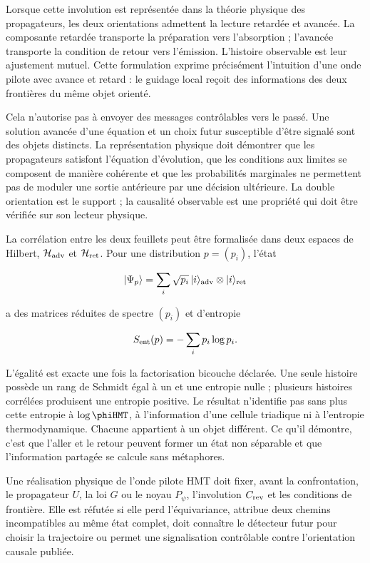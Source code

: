 Lorsque cette involution est représentée dans la théorie physique des propagateurs, les deux
orientations admettent la lecture retardée et avancée. La composante retardée
transporte la préparation vers l'absorption ; l'avancée transporte la condition
de retour vers l'émission. L'histoire observable est leur ajustement mutuel. Cette
formulation exprime précisément l'intuition d'une onde pilote avec avance
et retard : le guidage local reçoit des informations des deux frontières du même objet
orienté.

Cela n'autorise pas à envoyer des messages contrôlables vers le passé.
Une solution avancée d'une équation et un choix futur susceptible d'être signalé sont des objets
distincts. La représentation physique doit démontrer que les propagateurs satisfont
l'équation d'évolution, que les conditions aux limites se composent
de manière cohérente et que les probabilités marginales ne permettent pas de moduler une
sortie antérieure par une décision ultérieure. La double orientation est le
support ; la causalité observable est une propriété qui doit être vérifiée sur son
lecteur physique.

La corrélation entre les deux feuillets peut être formalisée dans deux espaces de Hilbert,
\(\mathcal H_{\rm adv}\) et \(\mathcal H_{\rm ret}\). Pour une distribution
\(p=(p_i)\), l'état

\[
  |\Psi_p\rangle
  =
  \sum_i\sqrt{p_i}\,
  |i\rangle_{\rm adv}\otimes|i\rangle_{\rm ret}
\]

a des matrices réduites de spectre \((p_i)\) et d'entropie

\[
  S_{\rm ent}(p)=-\sum_i p_i\log p_i.
\]

L'égalité est exacte une fois la factorisation bicouche déclarée. Une seule histoire
possède un rang de Schmidt égal à un et une entropie nulle ; plusieurs histoires corrélées
produisent une entropie positive. Le résultat n'identifie pas sans plus cette entropie à
\(\log\phiHMT\), à l'information d'une cellule triadique ni à l'entropie
thermodynamique. Chacune appartient à un objet différent. Ce qu'il démontre, c'est que
l'aller et le retour peuvent former un état non séparable et que l'information partagée
se calcule sans métaphores.

\begin{test}
Une réalisation physique de l'onde pilote HMT doit fixer, avant la confrontation, le
propagateur \(U\), la loi \(G\) ou le noyau \(P_\psi\), l'involution
\(C_{\rm rev}\) et les conditions de frontière. Elle est réfutée si elle perd
l'équivariance, attribue deux chemins incompatibles au même état complet, doit
connaître le détecteur futur pour choisir la trajectoire ou permet une signalisation
contrôlable contre l'orientation causale publiée.
\end{test}

